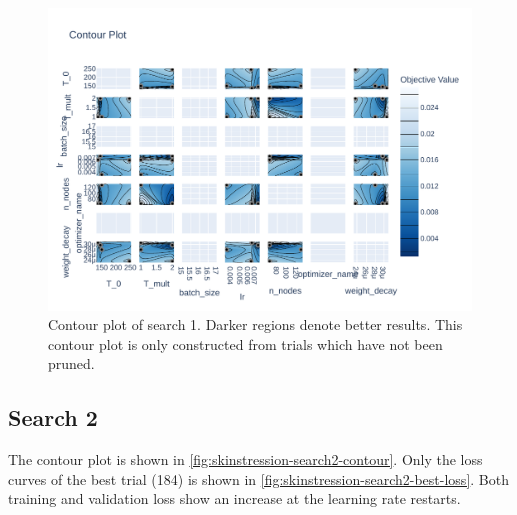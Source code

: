 \begin{figure}
    \centering
    \includegraphics[angle=90,width=0.9\textheight, height=\linewidth,keepaspectratio]{skinstression/images/hyperparameter-search/search-1/contour.pdf}
    \caption[Search 1 contour plot]{
        Contour plot of search 1.
        Darker regions denote better results.
        This contour plot is only constructed from trials which have not been pruned.
    }
    \label{fig:skinstression-search1-contour}
\end{figure}

\subsection{Search 2}
The contour plot is shown in \cref{fig:skinstression-search2-contour}.
Only the loss curves of the best trial (184) is shown in \cref{fig:skinstression-search2-best-loss}.
Both training and validation loss show an increase at the learning rate restarts.

